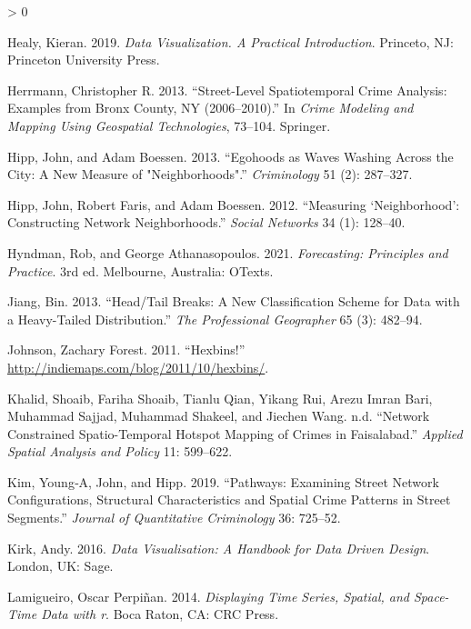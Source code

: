 \documentclass[
  krantz2]{krantz}
\newlength{\cslhangindent}
\newenvironment{CSLReferences}[2] %
 {%
  \setlength{\parindent}{0pt}
  \ifodd #1 \everypar{\setlength{\hangindent}{\cslhangindent}}\ignorespaces\fi
  \ifnum #2 > 0
  \setlength{\parskip}{#2\baselineskip}
  \fi
 }%
 {}
\begin{document}
\begin{CSLReferences}{1}{0}
\leavevmode\hypertarget{ref-Healy_2019}{}%
Healy, Kieran. 2019. \emph{Data Visualization. A Practical Introduction}. Princeto, NJ: Princeton University Press.

\leavevmode\hypertarget{ref-Herrmann_2013}{}%
Herrmann, Christopher R. 2013. {``Street-Level Spatiotemporal Crime Analysis: Examples from Bronx County, NY (2006--2010).''} In \emph{Crime Modeling and Mapping Using Geospatial Technologies}, 73--104. Springer.

\leavevmode\hypertarget{ref-Hipp_2013}{}%
Hipp, John, and Adam Boessen. 2013. {``Egohoods as Waves Washing Across the City: A New Measure of "Neighborhoods".''} \emph{Criminology} 51 (2): 287--327.

\leavevmode\hypertarget{ref-Hipp_2012}{}%
Hipp, John, Robert Faris, and Adam Boessen. 2012. {``Measuring {`Neighborhood'}: Constructing Network Neighborhoods.''} \emph{Social Networks} 34 (1): 128--40.

\leavevmode\hypertarget{ref-Hyndman_2021}{}%
Hyndman, Rob, and George Athanasopoulos. 2021. \emph{Forecasting: Principles and Practice}. 3rd ed. Melbourne, Australia: OTexts.

\leavevmode\hypertarget{ref-Jiang_2013}{}%
Jiang, Bin. 2013. {``Head/Tail Breaks: A New Classification Scheme for Data with a Heavy-Tailed Distribution.''} \emph{The Professional Geographer} 65 (3): 482--94.

\leavevmode\hypertarget{ref-Johnson_2011}{}%
Johnson, Zachary Forest. 2011. {``Hexbins!''} \url{http://indiemaps.com/blog/2011/10/hexbins/}.

\leavevmode\hypertarget{ref-Khalid_2018}{}%
Khalid, Shoaib, Fariha Shoaib, Tianlu Qian, Yikang Rui, Arezu Imran Bari, Muhammad Sajjad, Muhammad Shakeel, and Jiechen Wang. n.d. {``Network Constrained Spatio-Temporal Hotspot Mapping of Crimes in Faisalabad.''} \emph{Applied Spatial Analysis and Policy} 11: 599--622.

\leavevmode\hypertarget{ref-Kim_2019}{}%
Kim, Young‑A, John, and Hipp. 2019. {``Pathways: Examining Street Network Configurations, Structural Characteristics and Spatial Crime Patterns in Street Segments.''} \emph{Journal of Quantitative Criminology} 36: 725--52.

\leavevmode\hypertarget{ref-Kirk_2016}{}%
Kirk, Andy. 2016. \emph{Data Visualisation: A Handbook for Data Driven Design}. London, UK: Sage.

\leavevmode\hypertarget{ref-Perpinan_2014}{}%
Lamigueiro, Oscar Perpiñan. 2014. \emph{Displaying Time Series, Spatial, and Space-Time Data with r}. Boca Raton, CA: CRC Press.


\end{CSLReferences}
\end{document}
